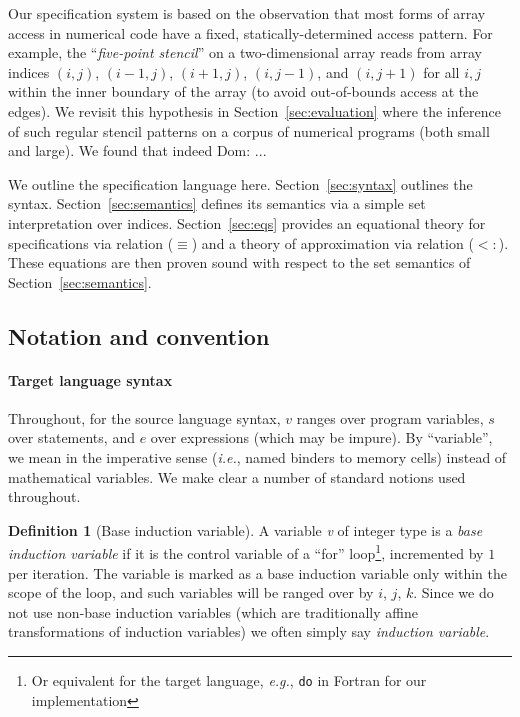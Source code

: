 \documentclass[9pt]{sigplanconf}
\newcommand{\dnote}[1]{\textcolor{darkpurple}{Dom: #1}}
\newcounter{block}
\theoremstyle{definition}
\newtheorem{definition}[block]{Definition}
\newcommand{\ie}{\emph{i.e.}}
\newcommand{\eg}{\emph{e.g.}}
\begin{document}
Our specification system is based on the observation
that most forms of array access in numerical code have
a fixed, statically-determined access pattern. For example, the
``\emph{five-point stencil}'' on a two-dimensional array reads from array
indices $(i, j)$, $(i-1, j)$, $(i+1, j)$, $(i, j-1)$, and $(i, j+1)$
for all $i, j$ within the inner boundary of the array (to avoid
out-of-bounds access at the edges). We revisit this hypothesis
in Section~\ref{sec:evaluation} where the inference of
such regular stencil patterns on a corpus of numerical programs (both
small and large). We found that indeed \dnote{..}.

We outline the specification language here. Section~\ref{sec:syntax}
outlines the syntax. Section~\ref{sec:semantics} defines its semantics
via a simple set interpretation over indices. Section~\ref{sec:eqs} provides an
equational theory for specifications via relation ($\equiv$) and a
theory of approximation via relation ($<:$). These equations are then
proven sound with respect to the set semantics of Section~\ref{sec:semantics}.

\subsection{Notation and convention}
\label{sec:notation}

\renewcommand*{\arraystretch}{0.8}
\paragraph{Target language syntax} Throughout, for the source language
syntax, $v$ ranges over program variables, $s$ over statements, and
$e$ over expressions (which may be impure).  By ``variable'', we mean
in the imperative sense (\ie{}, named binders to memory cells) instead
of mathematical variables. We make clear a number of standard notions
used throughout.

\begin{definition}[Base induction variable]
  A variable \textit{v} of integer type is a \emph{base induction
    variable} if it is the control variable of a ``for''
  loop\footnote{Or equivalent for the target language, \eg{},
    \texttt{do} in Fortran for our implementation}, incremented by $1$ per
iteration. The variable is marked as a base induction variable
only within the scope of the loop, and such variables will be ranged
over by $i$, $j$, $k$. Since we do not use non-base induction
variables (which are traditionally affine transformations of induction
variables) we often simply say \emph{induction variable}.
\end{definition}
\end{document}
